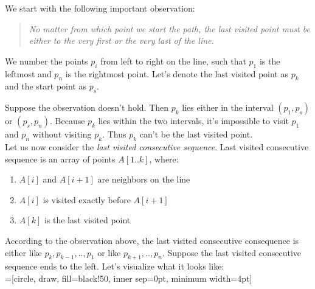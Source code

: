 
We start with the following important observation:

\begin{quote}
  \textit{No matter from which point we start the path, the last visited point must be either to the very first or the very last of the line.}
\end{quote}

We number the points $p_i$ from left to right on the line, such that $p_1$ is the leftmost and $p_n$ is the rightmost point. Let's denote the last visited point as $p_k$ and the start point as $p_s$.

Suppose the observation doesn't hold. Then $p_k$ lies either in the interval $(p_1, p_s)$ or $(p_s, p_n)$. Because $p_k$ lies within the two intervals, it's impossible to visit $p_1$ and $p_n$ without visiting $p_k$. Thus $p_k$ can't be the last visited point.\\

Let us now consider the \textit{last visited consecutive sequence}. Last visited consecutive sequence is an array of points $A[1..k]$, where:

\begin{enumerate}
\item $A[i]$ and $A[i+1]$ are neighbors on the line
\item $A[i]$ is visited exactly before $A[i+1]$
\item $A[k]$ is the last visited point
\end{enumerate}

According to the observation above, the last visited consecutive consequence is either like $p_k, p_{k-1}, .., p_1$ or like $p_{k+1}, .., p_n$. Suppose the last visited consecutive sequence ends to the left. Let's visualize what it looks like:\\

=[circle, draw, fill=black!50,
                        inner sep=0pt, minimum width=4pt]
\quad

